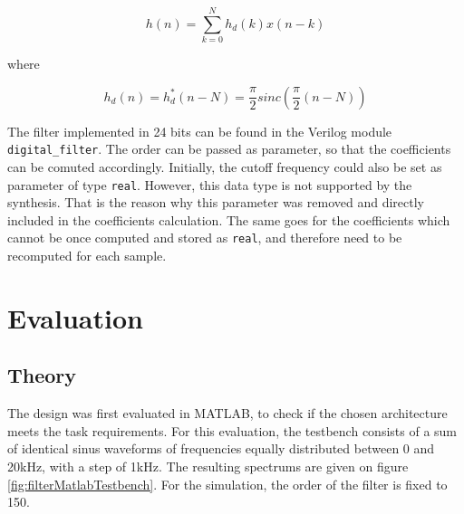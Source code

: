 \[
h(n) = \sum_{k=0}^{N} h_d(k) x(n-k)
\]

where

\[
h_d(n) = h_d^*(n-N) = \frac{\pi}{2} sinc(\frac{\pi}{2} (n-N))
\]

The filter implemented in 24 bits can be found in the Verilog module \texttt{digital\_filter}. The order can be passed as parameter, so that the coefficients can be comuted accordingly. Initially, the cutoff frequency could also be set as parameter of type \texttt{real}. However, this data type is not supported by the synthesis. That is the reason why this parameter was removed and directly included in the coefficients calculation. The same goes for the coefficients which cannot be once computed and stored as \texttt{real}, and therefore need to be recomputed for each sample.

\section{Evaluation}

\subsection{Theory}

The design was first evaluated in MATLAB, to check if the chosen architecture meets the task requirements. For this evaluation, the testbench consists of a sum of identical sinus waveforms of frequencies equally distributed between 0 and 20kHz, with a step of 1kHz. The resulting spectrums are given on figure \ref{fig:filterMatlabTestbench}. For the simulation, the order of the filter is fixed to 150.

